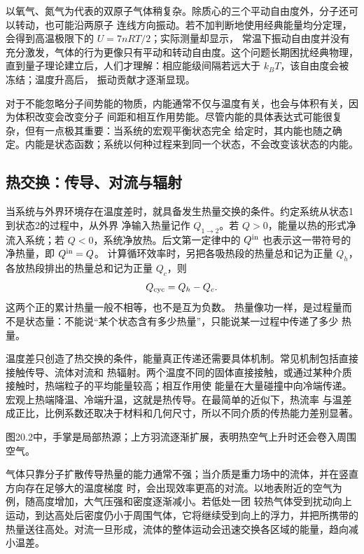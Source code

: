 以氧气、氮气为代表的双原子气体稍复杂。除质心的三个平动自由度外，分子还可以转动，也可能沿两原子
连线方向振动。若不加判断地使用经典能量均分定理，会得到高温极限下的 $U=7nRT/2$；实际测量却显示，
常温下振动自由度并没有充分激发，气体的行为更像只有平动和转动自由度。这个问题长期困扰经典物理，
直到量子理论建立后，人们才理解：相应能级间隔若远大于 $k_BT$，该自由度会被冻结；温度升高后，
振动贡献才逐渐显现。

对于不能忽略分子间势能的物质，内能通常不仅与温度有关，也会与体积有关，因为体积改变会改变分子
间距和相互作用势能。尽管内能的具体表达式可能很复杂，但有一点极其重要：当系统的宏观平衡状态完全
给定时，其内能也随之确定。内能是状态函数；系统以何种过程来到同一个状态，不会改变该状态的内能。

\subsection*{热交换：传导、对流与辐射}

当系统与外界环境存在温度差时，就具备发生热量交换的条件。约定系统从状态1到状态2的过程中，从外界
净输入热量记作 $Q_{1\to2}$。若 $Q>0$，能量以热的形式净流入系统；若
$Q<0$，系统净放热。后文第一定律中的 $Q^{\rm in}$ 也表示这一带符号的净热量，即 $Q^{\rm in}=Q$。
计算循环效率时，另把各吸热段的热量总和记为正量 $Q_h$，各放热段排出的热量总和记为正量 $Q_c$，则
\begin{equation*}
  Q_{\rm cyc}=Q_h-Q_c.
\end{equation*}
这两个正的累计热量一般不相等，也不是互为负数。
热量像功一样，是过程量而不是状态量：不能说“某个状态含有多少热量”，只能说某一过程中传递了多少
热量。

温度差只创造了热交换的条件，能量真正传递还需要具体机制。常见机制包括直接接触传导、流体对流和
热辐射。两个温度不同的固体直接接触，或通过某种介质接触时，热端粒子的平均能量较高；相互作用使
能量在大量碰撞中向冷端传递。宏观上热端降温、冷端升温，这就是热传导。在最简单的近似下，热流率
与温差成正比，比例系数还取决于材料和几何尺寸，所以不同介质的传热能力差别显著。

图20.2中，手掌是局部热源；上方羽流逐渐扩展，表明热空气上升时还会卷入周围空气。

气体只靠分子扩散传导热量的能力通常不强；当介质是重力场中的流体，并在竖直方向存在足够大的温度梯度
时，会出现效率更高的对流。以地表附近的空气为例，随高度增加，大气压强和密度逐渐减小。若低处一团
较热气体受到扰动向上运动，到达高处后密度仍小于周围气体，它将继续受到向上的浮力，并把所携带的
热量送往高处。对流一旦形成，流体的整体运动会迅速交换各区域的能量，趋向减小温差。

